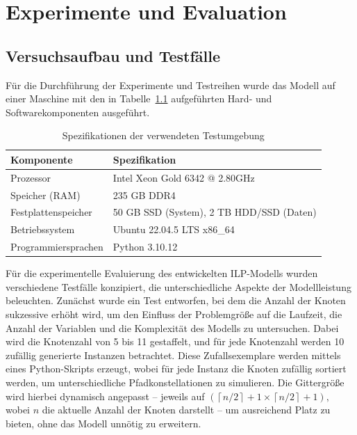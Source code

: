 \documentclass[bachelor, german]{algothesis}
\begin{document}
\chapter{Experimente und Evaluation}
\section{Versuchsaufbau und Testfälle}
Für die Durchführung der Experimente und Testreihen wurde das Modell auf einer Maschine mit den in Tabelle~\ref{tab:spezifikationen} aufgeführten Hard- und Softwarekomponenten ausgeführt.
\begin{table}[H]
    \centering
    \begin{tabular}{|l|l|}
        \hline
        \textbf{Komponente}         & \textbf{Spezifikation} \\
        \hline
        Prozessor                   & Intel Xeon Gold 6342 @ 2.80GHz \\
        \hline
        Speicher (RAM)              & 235 GB DDR4 \\
        \hline
        Festplattenspeicher         & 50 GB SSD (System), 2 TB HDD/SSD (Daten) \\
        \hline
        Betriebssystem              &  Ubuntu 22.04.5 LTS x86\_64 \\
        \hline
        Programmiersprachen         & Python 3.10.12 \\
        \hline
    \end{tabular}
    \caption{Spezifikationen der verwendeten Testumgebung}
    \label{tab:spezifikationen}
\end{table}
Für die experimentelle Evaluierung des entwickelten ILP-Modells wurden verschiedene Testfälle konzipiert, die unterschiedliche Aspekte der Modellleistung beleuchten. Zunächst wurde ein Test entworfen, bei dem die Anzahl der Knoten sukzessive erhöht wird, um den Einfluss der Problemgröße auf die Laufzeit, die Anzahl der Variablen und die Komplexität des Modells zu untersuchen. Dabei wird die Knotenzahl von 5 bis 11 gestaffelt, und für jede Knotenzahl werden 10 zufällig generierte Instanzen betrachtet. Diese Zufallsexemplare werden mittels eines Python-Skripts erzeugt, wobei für jede Instanz die Knoten zufällig sortiert werden, um unterschiedliche Pfadkonstellationen zu simulieren. Die Gittergröße wird hierbei dynamisch angepasst – jeweils auf $(\left\lceil n/2 \right\rceil+1 \times \left\lceil n/2 \right\rceil+1),$ wobei $n$ die aktuelle Anzahl der Knoten darstellt – um ausreichend Platz zu bieten, ohne das Modell unnötig zu erweitern.\newline
\end{document}
